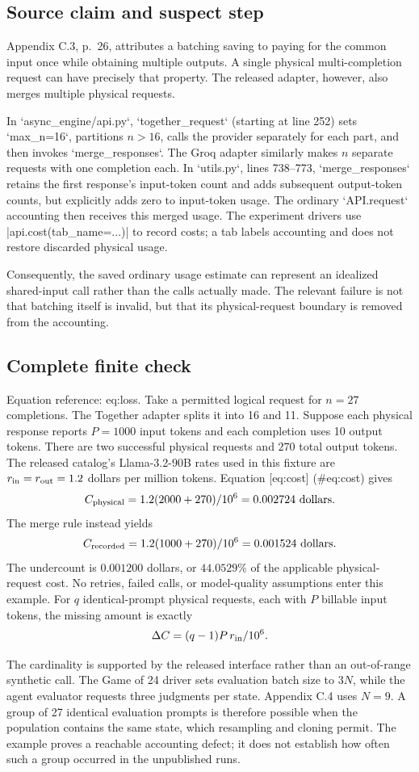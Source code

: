 \documentclass[10pt]{article}
\begin{document}
\subsection*{Source claim and suspect step}
Appendix C.3, p. 26, attributes a batching saving to paying for the common input once while obtaining multiple outputs. A single physical multi-completion request can have precisely that property. The released adapter, however, also merges multiple physical requests.\par
In `async\_engine/api.py`, `together\_request` (starting at line 252) sets `max\_n=16`, partitions \(n>16\), calls the provider separately for each part, and then invokes `merge\_responses`. The Groq adapter similarly makes \(n\) separate requests with one completion each. In `utils.py`, lines 738–773, `merge\_responses` retains the first response’s input-token count and adds subsequent output-token counts, but explicitly adds zero to input-token usage. The ordinary `API.request` accounting then receives this merged usage. The experiment drivers use |api.cost(tab\_name=...)| to record costs; a tab labels accounting and does not restore discarded physical usage.\par
Consequently, the saved ordinary usage estimate can represent an idealized shared-input call rather than the calls actually made. The relevant failure is not that batching itself is invalid, but that its physical-request boundary is removed from the accounting.\par
\subsection*{Complete finite check}
Equation reference: eq:loss. Take a permitted logical request for \(n=27\) completions. The Together adapter splits it into 16 and 11. Suppose each physical response reports \(P=1000\) input tokens and each completion uses 10 output tokens. There are two successful physical requests and \(270\) total output tokens. The released catalog’s Llama-3.2-90B rates used in this fixture are \(r_{\rm in}=r_{\rm out}=1.2\) dollars per million tokens. Equation [eq:cost] (\#eq:cost) gives \[C_{\rm physical}
 =1.2(2000+270)/10^6
 =0.002724\ {\rm dollars}.\] The merge rule instead yields \[C_{\rm recorded}
 =1.2(1000+270)/10^6
 =0.001524\ {\rm dollars}.\] The undercount is \(0.001200\) dollars, or \(44.0529\%\) of the applicable physical-request cost. No retries, failed calls, or model-quality assumptions enter this example. For \(q\) identical-prompt physical requests, each with \(P\) billable input tokens, the missing amount is exactly \[
 \Delta C=(q-1)P\,r_{\rm in}/10^6.\]\par
The cardinality is supported by the released interface rather than an out-of-range synthetic call. The Game of 24 driver sets evaluation batch size to \(3N\), while the agent evaluator requests three judgments per state. Appendix C.4 uses \(N=9\). A group of 27 identical evaluation prompts is therefore possible when the population contains the same state, which resampling and cloning permit. The example proves a reachable accounting defect; it does not establish how often such a group occurred in the unpublished runs.\par
\end{document}
